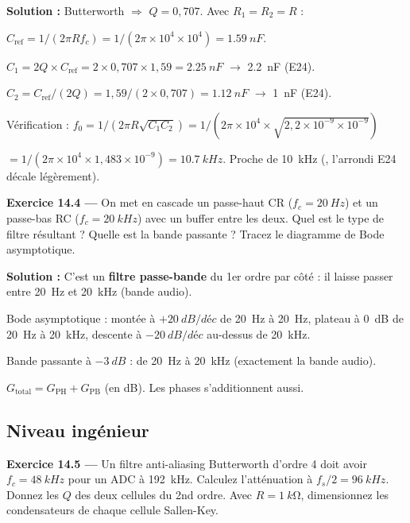 \documentclass[12pt,a4paper,twoside]{book}
\begin{document}
\begin{pratique}
\textbf{Solution :} Butterworth $\Rightarrow$ $Q = 0{,}707$. Avec $R_1 = R_2 = R$ :

$C_{\text{ref}} = 1/(2\pi R f_c) = 1/(2\pi\times10^4\times10^4) = \SI{1.59}{nF}$.

$C_1 = 2Q \times C_{\text{ref}} = 2\times0{,}707\times1{,}59 = \SI{2.25}{nF}$ $\to$ \SI{2.2}{nF} (E24).

$C_2 = C_{\text{ref}}/(2Q) = 1{,}59/(2\times0{,}707) = \SI{1.12}{nF}$ $\to$ \SI{1}{nF} (E24).

Vérification : $f_0 = 1/(2\pi R\sqrt{C_1 C_2}) = 1/(2\pi\times10^4\times\sqrt{2{,}2\times10^{-9}\times10^{-9}})$

$= 1/(2\pi\times10^4\times1{,}483\times10^{-9}) = \SI{10.7}{kHz}$. Proche de \SI{10}{kHz} (\checkmark, l'arrondi E24 décale légèrement).
\end{pratique}

\textbf{Exercice 14.4 ---} On met en cascade un passe-haut CR ($f_c = \SI{20}{Hz}$) et un passe-bas RC ($f_c = \SI{20}{kHz}$) avec un buffer entre les deux. Quel est le type de filtre résultant ? Quelle est la bande passante ? Tracez le diagramme de Bode asymptotique.

\begin{pratique}
\textbf{Solution :} C'est un \textbf{filtre passe-bande} du 1er ordre par côté : il laisse passer entre \SI{20}{Hz} et \SI{20}{kHz} (bande audio).

Bode asymptotique : montée à $+\SI{20}{dB/déc}$ de \SI{20}{Hz} à \SI{20}{Hz}, plateau à \SI{0}{dB} de \SI{20}{Hz} à \SI{20}{kHz}, descente à $-\SI{20}{dB/déc}$ au-dessus de \SI{20}{kHz}.

Bande passante à $-\SI{3}{dB}$ : de \SI{20}{Hz} à \SI{20}{kHz} (exactement la bande audio).

$G_{\text{total}} = G_{\text{PH}} + G_{\text{PB}}$ (en dB). Les phases s'additionnent aussi.
\end{pratique}

\subsection*{Niveau ingénieur}

\textbf{Exercice 14.5 ---} Un filtre anti-aliasing Butterworth d'ordre 4 doit avoir $f_c = \SI{48}{kHz}$ pour un ADC à \SI{192}{kHz}. Calculez l'atténuation à $f_s/2 = \SI{96}{kHz}$. Donnez les $Q$ des deux cellules du 2nd ordre. Avec $R = \SI{1}{k\ohm}$, dimensionnez les condensateurs de chaque cellule Sallen-Key.
\end{document}
